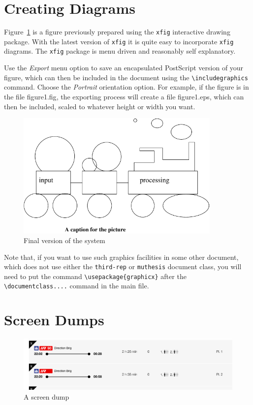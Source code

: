 \section{Creating Diagrams}
\label{sec:diagrams}

Figure~\ref{fig:fig-eg} is a figure previously prepared using the
\texttt{xfig} interactive drawing package. With the latest version of
\texttt{xfig} it is quite easy to incorporate \texttt{xfig} diagrams.
The \texttt{xfig} package is menu driven and reasonably self
explanatory.

Use the \emph{Export} menu option to save an encapsulated PostScript
version of your figure, which can then be included in the document
using the \verb=\includegraphics= command. Choose the \emph{Portrait}
orientation option. For example, if the figure is in the file \textsf{
	figure1.fig}, the exporting process will create a file \textsf{
	figure1.eps}, which can then be included, scaled to whatever height
or width you want.


\begin{figure}
	\begin{center}
		\includegraphics[width=10cm]{figure1} %
	\end{center}
	\caption{Final version of the system}
	\label{fig:fig-eg}
\end{figure}

Note that, if you want to use such graphics facilities in some other
document, which does not use either the \texttt{third-rep} or
\texttt{muthesis} document class, you will need to put the command
\verb=\usepackage{graphicx}= after the \verb=\documentclass....=
command in the main file.

\section{Screen Dumps}
\label{sec:screen-dumps}
\begin{figure}
	\begin{center}
		\includegraphics[width=12cm]{screen.png}
	\end{center}
	\caption{A screen dump}
	\label{fig:scr-dump}
\end{figure}

